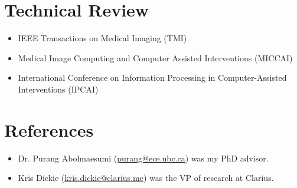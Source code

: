 \documentclass[letterpaper,11pt]{article}
\newcommand{\reviewItem}[1]{
  \item\small{#1 \vspace{-2pt}}
}
\newcommand{\resumeSubHeadingListStart}{\begin{itemize}[leftmargin=*]}
\newcommand{\resumeSubHeadingListEnd}{\end{itemize}}
\begin{document}
\section{Technical Review}
  \resumeSubHeadingListStart
    \reviewItem{IEEE Transactions on Medical Imaging (TMI)}
    \reviewItem{Medical Image Computing and Computer Assisted Interventions (MICCAI)}
    \reviewItem{International Conference on Information Processing in Computer-Assisted Interventions (IPCAI)}
  \resumeSubHeadingListEnd

  \section{References}
    \resumeSubHeadingListStart
      \reviewItem{Dr. Purang Abolmaesumi (\href{mailto:purang@ece.ubc.ca}{purang@ece.ubc.ca}) was my PhD advisor.}
      \reviewItem{Kris Dickie (\href{mailto:kris.dickie@clarius.me}{kris.dickie@clarius.me}) was the VP of research at Clarius.}
    \resumeSubHeadingListEnd
\end{document}
